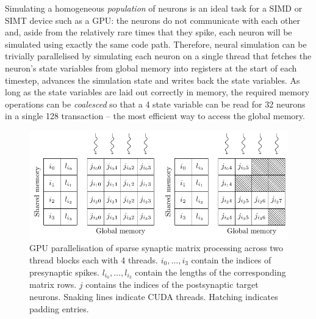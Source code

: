 \documentclass[utf8]{frontiersSCNS} %
\begin{document}
Simulating a homogeneous \textit{population} of neurons is an ideal task for a SIMD or SIMT device such as a GPU: the neurons do not communicate with each other and, aside from the relatively rare times that they spike, each neuron will be simulated using exactly the same code path.
Therefore, neural simulation can be trivially parallelised by simulating each neuron on a single thread that fetches the neuron's state variables from global memory into registers at the start of each timestep, advances the simulation state and writes back the state variables.
As long as the state variables are laid out correctly in memory, the required memory operations can be \textit{coalesced} so that a \SI{4}{\byte} state variable can be read for \num{32} neurons in a single \SI{128}{\byte} transaction -- the most efficient way to access the global memory.

\begin{figure}
    \begin{center}
        \includegraphics{figures/ragged_matrix}
    \end{center}
    \caption{GPU parallelisation of sparse synaptic matrix processing across two thread blocks each with \num{4} threads.
    $i_{0},\ldots,i_{3}$ contain the indices of presynaptic spikes.
    $l_{i_{0}},\ldots,l_{i_{3}}$ contain the lengths of the corresponding matrix rows.
    $j$ contains the indices of the postsynaptic target neurons.
    Snaking lines indicate CUDA threads.
    Hatching indicates padding entries.}
    \label{fig:ragged_matrix}
\end{figure}
\end{document}
